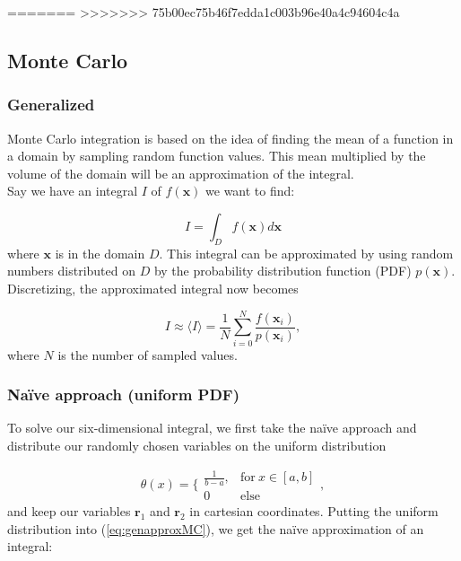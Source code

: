 \documentclass[../main.tex]{subfiles}
\begin{document}
=======
>>>>>>> 75b00ec75b46f7edda1c003b96e40a4c94604c4a


\subsection{Monte Carlo}
\subsubsection{Generalized}
\label{sec:MC}
Monte Carlo integration is based on the idea of finding the mean of a function in a domain by sampling random function values. This mean multiplied by the volume of the domain will be an approximation of the integral. \\

Say we have an integral $I$ of $f(\mathbf x)$ we want to find:

\begin{equation*}
  I=\int_D f(\mathbf x)d\mathbf x
\end{equation*}
where $\mathbf{x}$ is in the domain $D$. This integral can be approximated by using random numbers distributed on $D$ by the probability distribution function (PDF) $p(\mathbf x)$. Discretizing, the approximated integral now becomes

\begin{equation}
  I \approx \langle I \rangle = \frac{1}{N}\sum_{i=0}^N\frac{f(\mathbf x_i)}{p(\mathbf x_i)},
  \label{eq:genapproxMC}
\end{equation}
where  $N$ is the number of sampled values.

\subsubsection{Naïve approach (uniform PDF)} \label{sec:naiveMC}
To solve our six-dimensional integral, we first take the naïve approach and distribute our randomly chosen variables on the uniform distribution

\begin{equation*}
  \theta (x) = \bigg\{ \begin{matrix}\frac{1}{b-a}, & \text{for}\ x\in[a,b] \\ 0 & \text{else}\end{matrix},
\end{equation*}
and keep our variables $\mathbf r_1$ and $\mathbf r_2$ in cartesian coordinates. Putting the uniform distribution into (\ref{eq:genapproxMC}), we get the naïve approximation of an integral:
\end{document}
